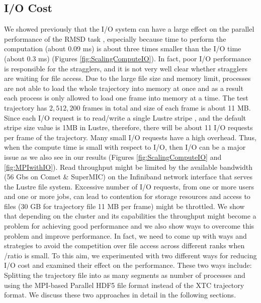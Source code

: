 \subsection{I/O Cost}
\label{I/O}
We showed previously that the I/O system can have a large effect on the parallel performance of the RMSD task \cite{Khoshlessan:2017ab},
especially because time to perform the computation \tcomp (about 0.09 ms) is about three times smaller than the I/O time \tIO (about 0.3 ms) (Figures \ref{fig:ScalingComputeIO}). 
In fact, poor I/O performance is responsible for the stragglers, and it is not very well clear whether stragglers are waiting for file access. 
Due to the large file size and memory limit, processes are not able to load the whole trajectory into memory at once and as a result each process is only allowed to load one frame into memory at a time.
The test trajectory has $2,512,200$ frames in total and size of each frame is about 11 MB.
Since each I/O request is to read/write a single Lustre stripe \cite{optimize_lustre}, and the default stripe size value is 1MB in Lustre, therefore, there will be about 11 I/O requests per frame of the trajectory.
Many small I/O requests have a high overhead. 
Thus, when the compute time is small with respect to I/O, then I/O can be a major issue as we also see in our results (Figures \ref{fig:ScalingComputeIO} and \ref{fig:MPIwithIO}).    
Read throughput might be limited by the available bandwidth (56 Gbs on Comet \& SuperMIC) on the Infiniband network interface that serves the Lustre file system.
Excessive number of I/O requests, from one or more users and one or more jobs, can lead to contention for storage resources and access to files (30 GB for trajectory file 11 MB per frame) might be throttled.
We show that depending on the cluster and its capabilities the throughput might become a problem for achieving good performance and we also show ways to overcome this problem and improve performance.
In fact, we need to come up with ways and strategies to avoid the competition over file access across different ranks when \tcomp/\tIO ratio is small.
To this aim, we experimented with two different ways for reducing I/O cost and examined their effect on the performance.
These two ways include: Splitting the trajectory file into as many segments as number of processes and using the MPI-based Parallel HDF5 file format instead of the XTC trajectory format.
We discuss these two approaches in detail in the following sections.

